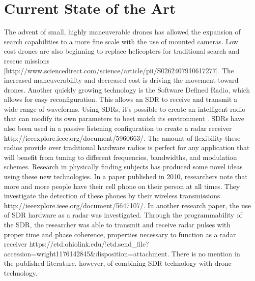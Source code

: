 \section{Current State of the Art}
The advent of small, highly maneuverable drones has allowed the expansion of search capabilities to a more fine scale with the use of mounted cameras. Low cost drones are also beginning to replace helicopters for traditional search and rescue missions [http://www.sciencedirect.com/science/article/pii/S0262407910617277]. The increased maneuverability and decreased cost is driving the movement toward drones.
Another quickly growing technology is the Software Defined Radio, which allows for easy reconfiguration. This allows an SDR to receive and transmit a wide range of waveforms. Using SDRs, it’s possible to create an intelligent radio that can modify its own parameters to best match its environment \cite{int_radio}. SDRs have also been used in a passive listening configuration to create a radar receiver {http://ieeexplore.ieee.org/document/5960663/}. The amount of flexibility these radios provide over traditional hardware radios is perfect for any application that will benefit from tuning to different frequencies, bandwidths, and modulation schemes.
Research in physically finding subjects has produced some novel ideas using these new technologies. In a paper published in 2010, researchers note that more and more people have their cell phone on their person at all times. They investigate the detection of these phones by their wireless transmissions {http://ieeexplore.ieee.org/document/5647107/}. In another research paper, the use of SDR hardware as a radar was investigated. Through the programmability of the SDR, the researcher was able to transmit and receive radar pulses with proper time and phase coherence, properties necessary to function as a radar receiver {https://etd.ohiolink.edu/!etd.send_file?accession=wright1176142845&disposition=attachment}. There is no mention in the published literature, however, of combining SDR technology with drone technology.
